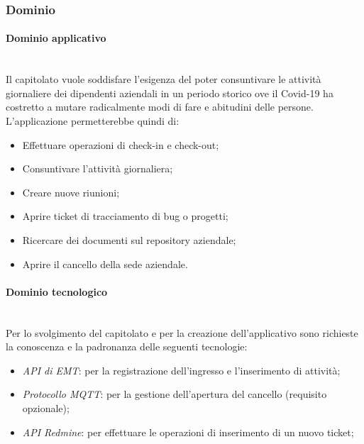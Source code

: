 \documentclass[11pt]{article}
\begin{document}
    \subsubsection{Dominio}
        \paragraph{Dominio applicativo}~\\

		\noindent
        Il capitolato vuole soddisfare l'esigenza del poter consuntivare le attività giornaliere dei dipendenti aziendali in un
        periodo storico ove il Covid-19 ha costretto a mutare radicalmente modi di fare e abitudini delle persone.
        L'applicazione permetterebbe quindi di:
		\begin{itemize}
			\item Effettuare operazioni di check-in e check-out;
			\item Consuntivare l'attività giornaliera;
			\item Creare nuove riunioni;
			\item Aprire ticket di tracciamento di bug o progetti;
			\item Ricercare dei documenti sul repository aziendale;
			\item Aprire il cancello della sede aziendale.			
		\end{itemize}		        
		
        \paragraph{Dominio tecnologico}~\\
        
        \noindent
        Per lo svolgimento del capitolato e per la creazione dell'applicativo sono richieste la conoscenza e la padronanza
        delle seguenti tecnologie:
        \begin{itemize}
            \item \textit{API di EMT}: per la registrazione dell'ingresso e l'inserimento di attività;
            \item \textit{Protocollo MQTT}: per la gestione dell'apertura del cancello (requisito opzionale);
            \item \textit{API Redmine}: per effettuare le operazioni di inserimento di un nuovo ticket;
        \end{itemize}
    
\end{document}
